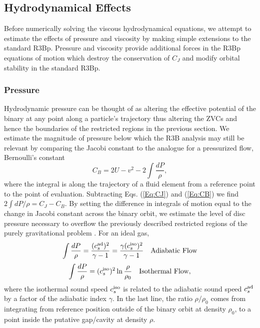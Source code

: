 \documentclass[usenatbib]{mnras}
\begin{document}
\subsection{Hydrodynamical Effects}
\label{Viscous and Pressure Effects}
Before numerically solving the viscous hydrodynamical equations, we attempt to estimate the effects of pressure and viscosity by making simple extensions to the standard R3Bp. Pressure and viscosity provide additional forces in the
R3Bp equations of motion which destroy the conservation of $C_J$ and 
modify orbital stability in the standard R3Bp.

\subsubsection{Pressure}
\label{Pressure}
Hydrodynamic pressure can be thought of
as altering the effective potential of the binary at any point along
a particle's trajectory thus altering the ZVCs and hence the
boundaries of the restricted regions in the previous section. 
We estimate the magnitude of pressure below which the R3B analysis may still be relevant by comparing 
the Jacobi constant to the analogue for a pressurized flow, Bernoulli's constant
\begin{equation}
C_B =  2U - v^2 - 2\int{\frac{dP}{\rho}},
\label{Eq:CB}
\end{equation}
where the integral is along the trajectory of a fluid element from a
reference point to the point of evaluation.  Subtracting Eqs.
(\ref{Eq:CJ}) and (\ref{Eq:CB}) we find $2\int{dP/\rho}= C_J - C_B$. 
By setting the difference in integrals of motion equal to the change in 
Jacobi constant across the binary orbit, we estimate the level of disc pressure 
necessary to overflow the previously described restricted regions of the purely gravitational problem \citep[see][who perform a similar calculation]{PR:InnerDsks:1981, RP:Excretion:1981}. For an ideal gas,
\[
\nonumber 
\int{\frac{dP}{\rho}} = \frac{(c^{\rm{ad}}_{s})^2 }{\gamma -1}  = \frac{\gamma (c^{\rm{iso}}_{s})^2 }{\gamma -1} \quad \rm{Adiabatic} \ \rm{Flow} \nonumber
\]
\begin{equation}
\label{dP_iso}
\int{\frac{dP}{\rho}} = (c^{\rm{iso}}_{s})^2 \ln{\frac{\rho}{\rho_0}} \quad \rm{Isothermal} \ \rm{Flow},
\end{equation}
where the isothermal sound speed $c^{\rm{iso}}_{s}$ is related to the
adiabatic sound speed $c^{\rm{ad}}_{s}$ by a factor of the adiabatic
index $\gamma$. In the last line, the ratio $\rho/\rho_0$ comes from
integrating from reference position outside of the binary orbit at
density $\rho_0$, to a point inside the putative gap/cavity at density $\rho$.
\end{document}
